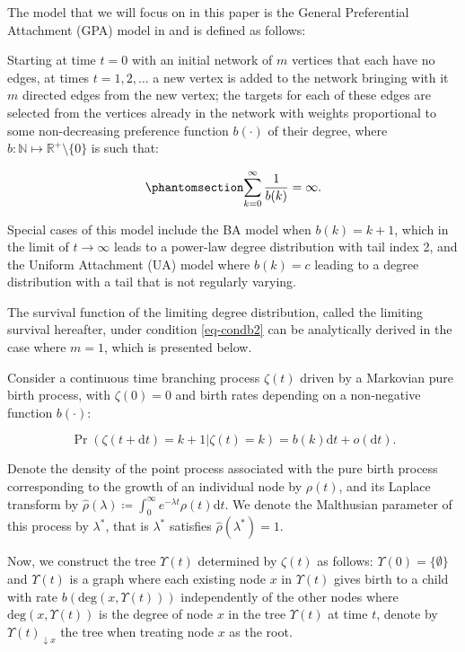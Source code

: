 \documentclass[
  sn-basic,
  10pt,
]{sn-jnl}
\theoremstyle{thmstyleone}
\theoremstyle{thmstyleone}
\theoremstyle{remark}
\theoremstyle{plain}
\theoremstyle{plain}
\theoremstyle{remark}
\begin{document}
The model that we will focus on in this paper is the General
Preferential Attachment (GPA) model in \citet{rudas07} and is defined as
follows:

Starting at time \(t=0\) with an initial network of \(m\) vertices that
each have no edges, at times \(t=1,2,\ldots\) a new vertex is added to
the network bringing with it \(m\) directed edges from the new vertex;
the targets for each of these edges are selected from the vertices
already in the network with weights proportional to some non-decreasing
preference function \(b(\cdot)\) of their degree, where
\(b: \mathbb N \mapsto \mathbb R^+\setminus\{0\}\) is such that:

\begin{equation}\phantomsection\label{eq-condb2}{
\sum_{k=0}^\infty\frac{1}{b(k)} = \infty.
}\end{equation}

Special cases of this model include the BA model when $b(k) = k+1$, which in the limit of $t\rightarrow \infty$ leads to a power-law degree distribution with tail index 2, and the Uniform Attachment (UA) model where $b(k)=c$ leading to a degree distribution with a tail that is not regularly varying.

The survival function of the limiting degree distribution, called the
limiting survival hereafter, under condition \ref{eq-condb2} can be
analytically derived in the case where \(m=1\), which is presented
below.

Consider a continuous time branching process \(\zeta(t)\) driven by a
Markovian pure birth process, with \(\zeta(0)=0\) and birth rates
depending on a non-negative function \(b(\cdot)\):

\[
\Pr(\zeta(t+\text{d}t)=k+1|\zeta(t)=k) = b(k)\text{d}t + o(\text{d}t).
\]

Denote the density of the point process associated with the pure birth
process corresponding to the growth of an individual node by
\(\rho(t)\), and its Laplace transform by
\(\hat \rho(\lambda)\coloneq \int_0^\infty e^{-\lambda t}\rho(t)\text{d}t\).
We denote the Malthusian parameter of this process by \(\lambda^*\),
that is \(\lambda^*\) satisfies \(\hat\rho(\lambda^*) = 1\).

Now, we construct the tree \(\Upsilon(t)\) determined by \(\zeta(t)\) as
follows: \(\Upsilon(0)=\{\emptyset\}\) and \(\Upsilon(t)\) is a graph
where each existing node \(x\) in \(\Upsilon(t)\) gives birth to a child
with rate \(b(\mathrm{deg}(x, \Upsilon(t)))\) independently of the other
nodes where \(\mathrm{deg}(x, \Upsilon(t))\) is the degree of node \(x\)
in the tree \(\Upsilon(t)\) at time \(t\), denote by
\(\Upsilon(t)_{\downarrow x}\) the tree when treating node \(x\) as the
root.
\end{document}
